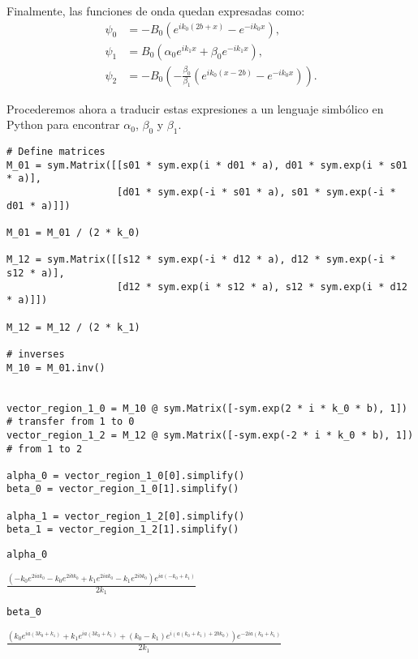 \documentclass[11pt]{article}
\begin{document}
Finalmente, las funciones de onda quedan expresadas como:
\begin{align*}
\psi_0 &= -B_0(e^{i k_0 (2b+x)} - e^{-ik_0x}), \\
\psi_1 &= B_0(\alpha_0 e^{i k_1x} + \beta_0e^{-ik_1x}), \\
\psi_2 &= -B_0\left(-\frac{\beta_0}{\beta_1} (e^{i k_0(x-2b)} - e^{-ik_0x})\right).
\end{align*}

Procederemos ahora a traducir estas expresiones a un lenguaje simbólico
en Python para encontrar \(\alpha_0\), \(\beta_0\) y \(\beta_1\).

\begin{verbatim}
# Define matrices
M_01 = sym.Matrix([[s01 * sym.exp(i * d01 * a), d01 * sym.exp(i * s01 * a)],
                   [d01 * sym.exp(-i * s01 * a), s01 * sym.exp(-i * d01 * a)]])

M_01 = M_01 / (2 * k_0)

M_12 = sym.Matrix([[s12 * sym.exp(-i * d12 * a), d12 * sym.exp(-i * s12 * a)],
                   [d12 * sym.exp(i * s12 * a), s12 * sym.exp(i * d12 * a)]])

M_12 = M_12 / (2 * k_1)

# inverses
M_10 = M_01.inv()


vector_region_1_0 = M_10 @ sym.Matrix([-sym.exp(2 * i * k_0 * b), 1]) # transfer from 1 to 0
vector_region_1_2 = M_12 @ sym.Matrix([-sym.exp(-2 * i * k_0 * b), 1]) # from 1 to 2

alpha_0 = vector_region_1_0[0].simplify()
beta_0 = vector_region_1_0[1].simplify()

alpha_1 = vector_region_1_2[0].simplify()
beta_1 = vector_region_1_2[1].simplify()
\end{verbatim}

\begin{verbatim}
alpha_0
\end{verbatim}

\label{org44e61dd}
\(\displaystyle \frac{\left(- k_{0} e^{2 i a k_{0}} - k_{0} e^{2 i b k_{0}} + k_{1} e^{2 i a k_{0}} - k_{1} e^{2 i b k_{0}}\right) e^{i a \left(- k_{0} + k_{1}\right)}}{2 k_{1}}\)

\begin{verbatim}
beta_0
\end{verbatim}

\label{org6794009}
\(\displaystyle \frac{\left(k_{0} e^{i a \left(3 k_{0} + k_{1}\right)} + k_{1} e^{i a \left(3 k_{0} + k_{1}\right)} + \left(k_{0} - k_{1}\right) e^{i \left(a \left(k_{0} + k_{1}\right) + 2 b k_{0}\right)}\right) e^{- 2 i a \left(k_{0} + k_{1}\right)}}{2 k_{1}}\)
\end{document}
